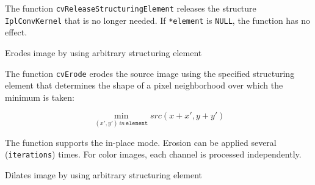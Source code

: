 \begin{description}
\end{description}

The function \texttt{cvReleaseStructuringElement} releases the structure \texttt{IplConvKernel} that is no longer needed. If \texttt{*element} is \texttt{NULL}, the function has no effect.

\label{Erode}

Erodes image by using arbitrary structuring element


\begin{description}
\end{description}

The function \texttt{cvErode} erodes the source image using the specified structuring element that determines the shape of a pixel neighborhood over which the minimum is taken:

\[
\min_{(x',y') \, in \, \texttt{element}}src(x+x',y+y')
\]

The function supports the in-place mode. Erosion can be applied several (\texttt{iterations}) times. For color images, each channel is processed independently.

\label{Dilate}

Dilates image by using arbitrary structuring element


\begin{description}
\end{description}

